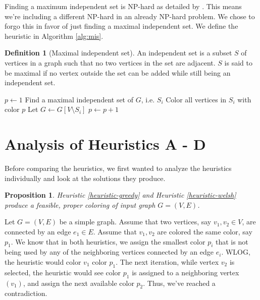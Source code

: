 \documentclass{article}
\newcounter{heuristic} \setcounter{heuristic}{0}
\newtheorem{prop}{Proposition}
\theoremstyle{definition}
\newtheorem{definition}{Definition}
\begin{document}
Finding a maximum independent set is NP-hard as detailed by \citet{karp1972reducibility}. This means we're including a different NP-hard in an already NP-hard problem. We chose to forgo this in favor of just finding a maximal independent set. We define the heuristic in Algorithm \ref{alg:mis}.

\begin{definition}[Maximal independent set]\label{def:mis}
An independent set is a subset $S$ of vertices in a graph such that no two vertices in the set are adjacent. $S$ is said to be maximal if no vertex outside the set can be added while still being an independent set.
\end{definition}

\begin{algorithm}
\caption{Maximal independent set algorithm}\label{alg:mis}
\begin{algorithmic}[1]
\State $p \leftarrow 1$
\State Find a maximal independent set of $G$, i.e. $S_i$
\State Color all vertices in $S_i$ with color $p$
\State Let $G \leftarrow G[V \setminus S_i ] $
\State $p \leftarrow p + 1$
\EndWhile
\end{algorithmic}
\end{algorithm}

\section{Analysis of Heuristics A - D}
Before comparing the heuristics, we first wanted to analyze the heuristics individually and look at the solutions they produce.

\begin{prop}
Heuristic \ref{heuristic-greedy} and Heuristic \ref{heuristic-welsh} produce a feasible, proper coloring of input graph \(G = (V, E)\).
\end{prop}

Let \(G = (V, E)\) be a simple graph. Assume that two vertices, say \(v_1, v_2 \in V\), are connected by an edge \(e_1 \in E\). Assume that \(v_1, v_2\) are colored the same color, say \(p_1\). We know that in both heuristics, we assign the smallest color \(p_i\) that is not being used by any of the neighboring vertices connected by an edge \(e_i\). WLOG, the heuristic would color \(v_1\) color \(p_1\). The next iteration, while vertex \(v_2\) is selected, the heuristic would see color \(p_1\) is assigned to a neighboring vertex \((v_1)\), and assign the next available color \(p_2\). Thus, we've reached a contradiction.
\end{document}
